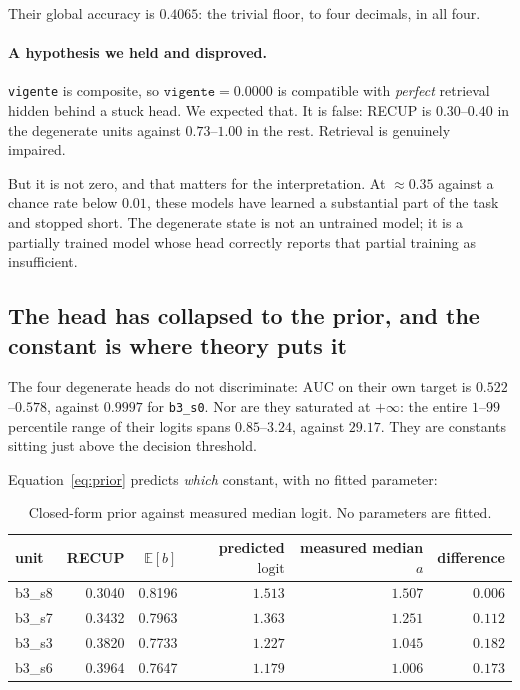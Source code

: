 \documentclass[11pt,a4paper]{article}
\begin{document}
Their global accuracy is $0.4065$: the trivial floor, to four decimals, in all four.

\paragraph{A hypothesis we held and disproved.} \texttt{vigente} is composite, so
$\texttt{vigente} = 0.0000$ is compatible with \emph{perfect} retrieval hidden behind a stuck head.
We expected that. It is false: RECUP is $0.30$--$0.40$ in the degenerate units against $0.73$--$1.00$
in the rest. Retrieval is genuinely impaired.

But it is not zero, and that matters for the interpretation. At $\approx 0.35$ against a chance rate
below $0.01$, these models have learned a substantial part of the task and stopped short. The
degenerate state is not an untrained model; it is a partially trained model whose head correctly
reports that partial training as insufficient.

\subsection{The head has collapsed to the prior, and the constant is where theory puts it}
\label{sec:prior}

The four degenerate heads do not discriminate: $\mathrm{AUC}$ on their own target is
$0.522$--$0.578$, against $0.9997$ for \texttt{b3\_s0}. Nor are they saturated at $+\infty$: the
entire $1$--$99$ percentile range of their logits spans $0.85$--$3.24$, against $29.17$. They are
constants sitting just above the decision threshold.

Equation~\eqref{eq:prior} predicts \emph{which} constant, with no fitted parameter:

\begin{table}[h]
\centering
\caption{Closed-form prior against measured median logit. No parameters are fitted.}
\begin{tabular}{lrrrrr}
\toprule
unit & RECUP & $\mathbb{E}[b]$ & predicted $\mathrm{logit}$ & measured median $a$ & difference \\
\midrule
b3\_s8 & 0.3040 & 0.8196 & $1.513$ & $1.507$ & $\mathbf{0.006}$ \\
b3\_s7 & 0.3432 & 0.7963 & $1.363$ & $1.251$ & $0.112$ \\
b3\_s3 & 0.3820 & 0.7733 & $1.227$ & $1.045$ & $0.182$ \\
b3\_s6 & 0.3964 & 0.7647 & $1.179$ & $1.006$ & $0.173$ \\
\bottomrule
\end{tabular}
\label{tab:prior}
\end{table}
\end{document}
